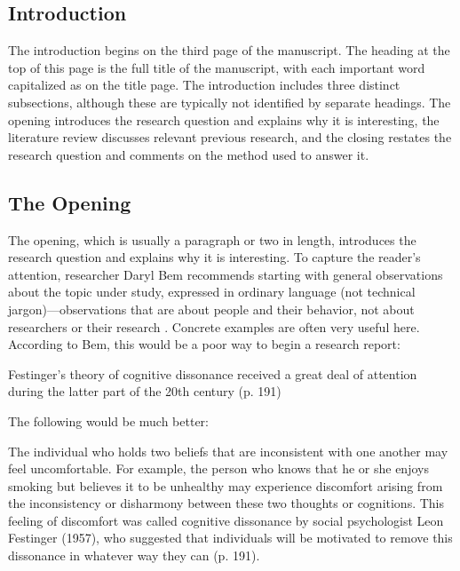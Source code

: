 \subsection{Introduction}

The introduction begins on the third page of the manuscript. The heading at the top of this page is the full title of the manuscript, with each important word capitalized as on the title page. The introduction includes three distinct subsections, although these are typically not identified by separate headings. The opening introduces the research question and explains why it is interesting, the literature review discusses relevant previous research, and the closing restates the research question and comments on the method used to answer it.


\subsection{The Opening}

The opening, which is usually a paragraph or two in length, introduces the research question and explains why it is interesting. To capture the reader's attention, researcher Daryl Bem recommends starting with general observations about the topic under study, expressed in ordinary language (not technical jargon)---observations that are about people and their behavior, not about researchers or their research \citep{bem_writing_????}. Concrete examples are often very useful here. According to Bem, this would be a poor way to begin a research report:


\begin{kframe}
Festinger's theory of cognitive dissonance received a great deal of attention during the latter part of the 20th century (p. 191)
\end{kframe}

The following would be much better:

\begin{kframe}
The individual who holds two beliefs that are inconsistent with one another may feel uncomfortable. For example, the person who knows that he or she enjoys smoking but believes it to be unhealthy may experience discomfort arising from the inconsistency or disharmony between these two thoughts or cognitions. This feeling of discomfort was called cognitive dissonance by social psychologist Leon Festinger (1957), who suggested that individuals will be motivated to remove this dissonance in whatever way they can (p. 191).

\end{kframe}

